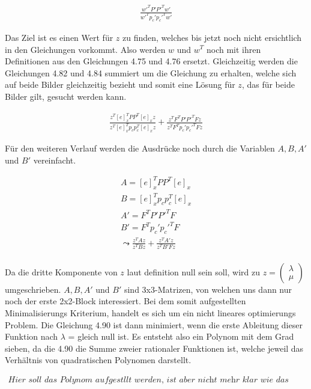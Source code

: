 \begin{gather}
	\frac{w'^TP'P'^Tw'}{w'^Tp_c'p_c'^Tw'}
\end{gather} 

Das Ziel ist es einen Wert für $z$ zu finden, welches bis jetzt noch nicht ersichtlich in den Gleichungen vorkommt. Also werden $w$ und $w^T$ noch mit ihren Definitionen aus den Gleichungen 4.75 und 4.76 ersetzt. Gleichzeitig werden die Gleichungen 4.82 und 4.84 summiert um die Gleichung zu erhalten, welche sich auf beide Bilder gleichzeitig bezieht und somit eine Lösung für $z$, das für beide Bilder gilt, gesucht werden kann.

\begin{gather}
	\frac{z^T[e]_x^TPP^T[e]_xz}{z^T[e]_x^Tp_cp_c^T[e]_xz}+\frac{z^TF^TP'P'^TFz}{z^TF^Tp_c'p_c'^TFz}
\end{gather}

Für den weiteren Verlauf werden die Ausdrücke noch durch die Variablen $A,B,A'$ und $B'$ vereinfacht.

\begin{gather}
	A = [e]_x^TPP^T[e]_x\\
	B=[e]_x^Tp_cp_c^T[e]_x\\
	A'=F^TP'P'^TF\\
	B'= F^Tp_c'p_c'^TF\\
	\leadsto 
	\frac{z^TAz}{z^TBz}+\frac{z^TA'z}{z^TB'Fz}
\end{gather}\\

Da die dritte Komponente von $z$ laut definition null sein soll, wird zu $z = \begin{pmatrix}
\lambda\\ \mu\end{pmatrix}$ umgeschrieben. $A,B,A'$ und $B'$ sind 3x3-Matrizen, von welchen uns dann nur noch der erste 2x2-Block interessiert. Bei dem somit aufgestellten Minimalisierungs Kriterium, handelt es sich um ein nicht lineares optimierungs Problem. Die Gleichung 4.90 ist dann minimiert, wenn die erste Ableitung dieser Funktion nach $\lambda$ = gleich null ist. Es entsteht also ein Polynom mit dem Grad sieben, da die 4.90 die Summe zweier rationaler Funktionen ist, welche jeweil das Verhältnis von quadratischen Polynomen darstellt.

\begin{gather}
\textit{Hier soll das Polynom aufgestllt werden, ist aber nicht mehr klar wie das ging!!!}
\end{gather}\\

